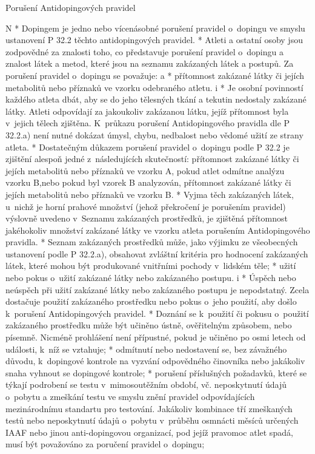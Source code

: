 \secc Porušení Antidopingových pravidel

\begitems \style N
* Dopingem je jedno nebo vícenásobné porušení pravidel o~dopingu ve smyslu ustanovení P 32.2 těchto antidopingových pravidel.
* Atleti a ostatní osoby jsou zodpovědné za znalosti toho, co představuje porušení pravidel o~dopingu a znalost látek a metod, které jsou na seznamu zakázaných látek a postupů. Za porušení pravidel o~dopingu se považuje:
  \begitems \style a
  * přítomnost zakázané látky či jejích metabolitů nebo příznaků ve vzorku odebraného atletu.
    \begitems \style i
    * Je osobní povinností každého atleta dbát, aby se do jeho tělesných tkání a tekutin nedostaly zakázané látky. Atleti odpovídají za jakoukoliv zakázanou látku, jejíž přítomnost byla v~jejich tělech zjištěna. K~průkazu porušení Antidopingového pravidla dle P 32.2.a) není nutné dokázat úmysl, chybu, nedbalost nebo vědomé užití ze strany atleta.
    * Dostatečným důkazem porušení pravidel o~dopingu podle P 32.2 je zjištění alespoň jedné z~následujících skutečností: přítomnost zakázané látky či jejích metabolitů nebo příznaků ve vzorku A, pokud atlet odmítne analýzu vzorku B,nebo pokud byl vzorek B analyzován, přítomnost zakázané látky či jejích metabolitů nebo příznaků ve vzorku B.
    * Vyjma těch zakázaných látek, u~nichž je horní prahové množství (jehož překročení je porušením pravidel) výslovně uvedeno v~Seznamu zakázaných prostředků, je zjištěná přítomnost jakéhokoliv množství zakázané látky ve vzorku atleta porušením Antidopingového pravidla.
    * Seznam zakázaných prostředků může, jako výjimku ze všeobecných ustanovení podle P 32.2.a), obsahovat zvláštní kritéria pro hodnocení zakázaných látek, které mohou být produkované vnitřními pochody v~lidském těle;
    \enditems
  * užití nebo pokus o~užití zakázané látky nebo zakázaného postupu.
    \begitems \style i
    * Úspěch nebo neúspěch při užití zakázané látky nebo zakázaného postupu je nepodstatný. Zcela dostačuje použití zakázaného prostředku nebo pokus o~jeho použití, aby došlo k~porušení Antidopingových pravidel.
    * Doznání se k~použití či pokusu o~použití zakázaného prostředku může být učiněno ústně, ověřitelným způsobem, nebo písemně. Nicméně prohlášení není přípustné, pokud je učiněno po osmi letech od události, k~níž se vztahuje;
    \enditems
  * odmítnutí nebo nedostavení se, bez závažného důvodu, k~dopingové kontrole na vyzvání odpovědného činovníka nebo jakákoliv snaha vyhnout se dopingové kontrole;
  * porušení příslušných požadavků, které se týkají podrobení se testu v~mimosoutěžním období, vč. neposkytnutí údajů o~pobytu a zmeškání testu ve smyslu znění pravidel odpovídajících mezinárodnímu standartu pro testování. Jakákoliv kombinace tří zmeškaných testů nebo neposkytnutí údajů o~pobytu v~průběhu osmnácti měsíců určených IAAF nebo jinou anti-dopingovou organizací, pod jejíž pravomoc atlet spadá, musí být považováno za poručení pravidel o~dopingu;
